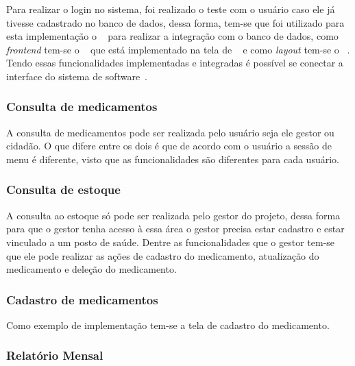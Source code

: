 Para realizar o login no sistema, foi realizado o teste com o usuário caso ele já tivesse cadastrado no banco de dados, dessa forma, tem-se que foi utilizado para esta implementação o ~ para realizar a integração com o banco de dados, como \emph{frontend} tem-se o ~ que está implementado na tela de ~ e como \emph{layout} tem-se o ~. Tendo essas funcionalidades implementadas e integradas é possível se conectar a interface do sistema de software~.

%


%

\subsubsection{Consulta de medicamentos}

A consulta de medicamentos pode ser realizada pelo usuário seja ele gestor ou cidadão. O que difere entre os dois é que de acordo com o usuário a sessão de menu é diferente, visto que as funcionalidades são diferentes para cada usuário.

%


\subsubsection{Consulta de estoque}

A consulta ao estoque só pode ser realizada pelo gestor do projeto, dessa forma para que o gestor tenha acesso à essa área o gestor precisa estar cadastro e estar vinculado a um posto de saúde. Dentre as funcionalidades que o gestor  tem-se que ele pode realizar as ações de cadastro do medicamento, atualização do medicamento e deleção do medicamento.

%


\subsubsection{Cadastro de medicamentos}

Como exemplo de implementação tem-se a tela de cadastro do medicamento.

\subsubsection{Relatório Mensal}
